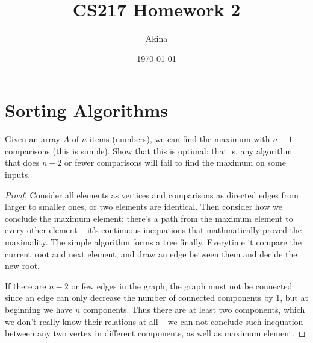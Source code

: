 \documentclass[11pt,a4paper,oneside]{article}
\renewcommand{\hwtitle} {CS217 Homework 2}
\renewcommand{\hwauthor}{Akina}
\renewcommand{\hwdate}{\today}
\begin{document}
\title{\hwtitle}
\author{\hwauthor}
\date{\hwdate}
\maketitle

\section*{Sorting Algorithms}
\begin{problem}{1}
	\statement
	Given an array $A$ of $n$ items (numbers), we can find the maximum with $n-1$ comparisons (this is simple).
	Show that this is optimal: that is, any algorithm that does $n-2$ or fewer comparisons will fail to find the maximum 
	on some inputs.
	\solution
	\begin{proof}
		Consider all elements as vertices and comparisons as directed edges from larger to smaller ones, or two elements are identical. Then consider how we conclude the maximum element: there's a path from the maximum element to every other element -- it's continuous inequations that mathmatically proved the maximality.
		The simple algorithm forms a tree finally. Everytime it compare the current root and next element, and draw an edge between them and decide the new root.

		If there are $n - 2$ or few edges in the graph, the graph must not be connected since an edge can only decrease the number of connected components by 1, but at beginning we have $n$ components. Thus there are at least two components, which we don't really know their relations at all -- we can not conclude such inequation between any two vertex in different components, as well as maximum element.
	\end{proof}
\end{problem}
\end{document}
